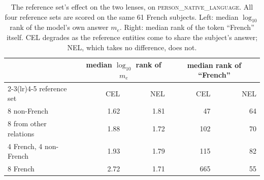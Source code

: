 \begin{table}[t]
\centering\small
\caption{The reference set's effect on the two lenses, on
\textsc{person\_native\_language}. All four reference sets are scored on
the same 61 French subjects. Left: median $\log_{10}$ rank of the
model's own answer $m_e$. Right: median rank of the token ``French''
itself. CEL degrades as the reference entities come to share the
subject's answer; NEL, which takes no difference, does not.}
\label{tab:refsets}

\begin{tabular}{@{}lrrrr@{}}
\toprule
& \multicolumn{2}{c}{median $\log_{10}$ rank of $m_e$}
& \multicolumn{2}{c}{median rank of ``French''} \\
\cmidrule(lr){2-3}\cmidrule(lr){4-5}
reference set & CEL & NEL & CEL & NEL \\
\midrule
8 non-French & 1.62 & 1.81 & 47 & 64 \\
8 from other relations & 1.88 & 1.72 & 102 & 70 \\
4 French, 4 non-French & 1.93 & 1.79 & 115 & 82 \\
8 French & 2.72 & 1.71 & 665 & 55 \\
\bottomrule
\end{tabular}
\end{table}
